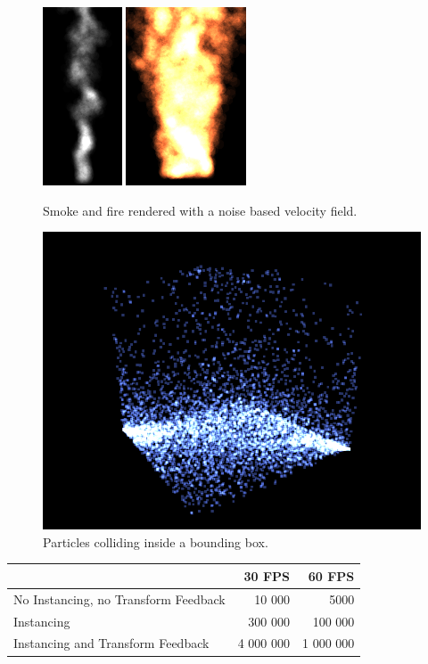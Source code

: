\documentclass[report]{vgtc}
\begin{document}
\begin{figure}[H]
\includegraphics[height=200px]{img/smoke.png}
\includegraphics[height=200px]{img/fire.png}
\caption{Smoke and fire rendered with a noise based velocity field.}
\end{figure}

\begin{figure}[H]
\includegraphics[scale=0.57]{img/cube.png}
\caption{Particles colliding inside a bounding box.}
\end{figure}

\begin{table}[H]
	\begin{tabular}{l | r | r}
		  & 30 FPS & 60 FPS   \\[1.0ex] \hline
  		No Instancing, no Transform Feedback & 10 000 & 5000  \\[1.0ex]
  		Instancing & 300 000 & 100 000  \\[1.0ex]
		Instancing and Transform Feedback & 4 000 000 & 1 000 000 \\[1.0ex]
	\end{tabular}
\end{table}	
\end{document}
